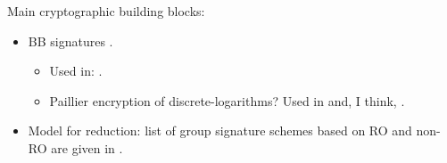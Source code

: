 Main cryptographic building blocks:

\begin{itemize}
\item BB signatures \cite{bb04}.
  \begin{itemize}
  \item Used in: \cite{ky05}.
  \item Paillier encryption of discrete-logarithms? Used in \cite{ky05} and,
    I think, \cite{gl19}.    
  \end{itemize}
\item Model for reduction: list of group signature schemes based on RO and
  non-RO are given in \cite{bcc+16}.
\end{itemize}

